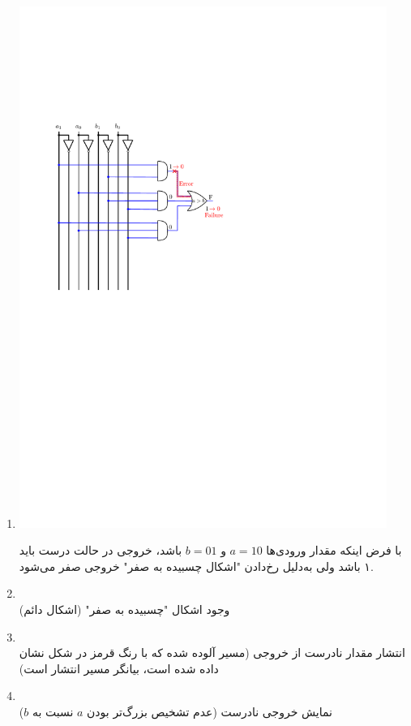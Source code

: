 \begin{qsolve}
	\begin{enumerate}
		\item [ ]
		
		\begin{center}
			\includegraphics[width=12cm]{pics/comp.pdf}
		\end{center}
		
		با فرض اینکه مقدار ورودی‌ها $a=10$ و $b=01$ باشد، خروجی در حالت درست باید ۱ باشد ولی به‌دلیل رخ‌دادن "اشکال چسبیده به صفر" خروجی صفر می‌شود.
		
		
		
		\item {}\\
		وجود اشکال "چسبیده به صفر" (اشکال دائم)
		
		\item {}\\
		انتشار مقدار نادرست از خروجی  (مسیر آلوده شده که با رنگ قرمز در شکل نشان داده شده است، بیانگر مسیر انتشار  است)
		
		\item {}\\
		نمایش خروجی نادرست (عدم تشخیص بزرگ‌تر بودن $a$ نسبت به $b$)
		
	\end{enumerate}
\end{qsolve}




